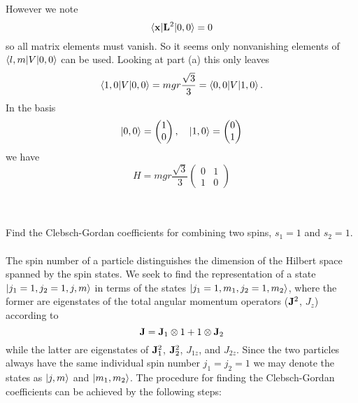 \documentclass[11pt,letterpaper]{article}
\begin{document}
		However we note
		\[
			\braket{\mathbf{x}|\mathbf{L}^2|0,0} = 0
		\]
		so all matrix elements must vanish. So it seems only nonvanishing elements of $\braket{l,m|V|0,0}$ can be used. Looking
		at part (a) this only leaves 
		\[
			\braket{1,0|V|0,0} = mgr\frac{\sqrt 3}{3} =  \braket{0,0|V|1,0}.
		\]
		In the basis
		\[
			\ket{0,0} = \begin{pmatrix}1\\0\end{pmatrix},\quad \ket{1,0} = \begin{pmatrix}0\\1\end{pmatrix}
		\]
		we have
		\[
			H = mgr\frac{\sqrt 3}{3} \begin{pmatrix}0&1\\1&0\end{pmatrix}
		\]
		\\
		\\
	\eenum
	\item
	Find the Clebsch-Gordan coefficients for combining two spins, $s_1 = 1$ and $s_2 = 1$. 
	\\
	\\
	The spin number of a particle distinguishes the dimension of the Hilbert space spanned by the spin states. We seek to find the 
	representation of a state $\ket{j_1=1,j_2=1,j,m}$ in terms of the states $	
	\ket{j_1=1,m_1,j_2=1,m_2}$, where
	the former are eigenstates of the total angular momentum operators ($\mathbf{J}^2$, $J_z$) according to
	\[
		\mathbf{J} = \mathbf{J}_1\otimes1 + 1\otimes \mathbf{J}_2
	\]
	while the latter are eigenstates of $\mathbf{J}_1^2$, $\mathbf{J}_2^2$, $J_{1z}$, and $J_{2z}$. Since the two particles always have the 
	same individual spin number $j_1=j_2= 1$ we may denote the states as $\ket{j,m}$ and $\ket{m_1,m_2}$. The procedure 
	for finding the Clebsch-Gordan coefficients can be achieved by the following steps:
\end{document}

